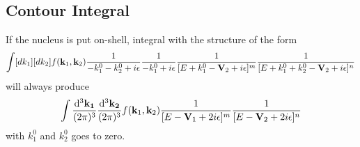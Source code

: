 \documentclass{article}
\renewcommand{\a}{\alpha}
\renewcommand{\b}{\beta}
\begin{document}
\begin{appendices}
	\section{Contour Integral}
	If the nucleus is put on-shell, integral with the structure of the form
	\begin{align*}
		\int[dk_1][dk_2]f(\vb{k}_1,\vb{k}_2)\frac{1}{-k_1^0-k_2^0+i\epsilon}\frac{1}{-k_1^0+i\epsilon}\frac{1}{[E+k_1^0-\vb{V}_2+i\epsilon]^m}\frac{1}{[E+k_1^0+k_2^0-\vb{V}_2+i\epsilon]^n}
	\end{align*}
	will always produce
	\begin{align*}
		\int\frac{\dd^3\vb{k_1}}{(2\pi)^3}\frac{\dd^3\vb{k_2}}{(2\pi)^3}f(\vb{k}_1,\vb{k}_2)\frac{1}{[E-\vb{V}_1+2i\epsilon]^m}\frac{1}{[E-\vb{V}_2+2i\epsilon]^n}
	\end{align*}
	with $k_1^0$ and $k_2^0$ goes to zero.


\end{appendices}
\end{document}
